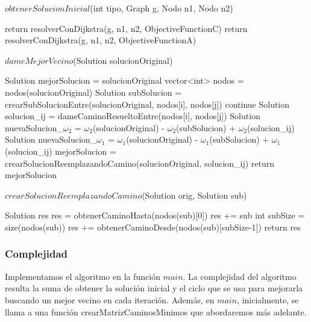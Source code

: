\begin{algorithm}[H]
\caption{$obtenerSolucionInicial$(int tipo, Graph g, Nodo n1, Nodo n2)}
\begin{algorithmic}[1]
	\State return resolverConDijkstra(g, n1, n2, ObjectiveFunctionC)
  \EndIf
  \State return resolverConDijkstra(g, n1, n2, ObjectiveFunctionA)
\end{algorithmic}
\end{algorithm}

\begin{algorithm}[H]
\caption{$dameMejorVecino$(Solution solucionOriginal)}
\begin{algorithmic}[1]	
	  \State Solution mejorSolucion = solucionOriginal
	  \State vector<int> nodos = nodos(solucionOriginal)
			\State Solution subSolucion = crearSubSolucionEntre(solucionOriginal, nodos[i], nodos[j])
				\State continue
			\EndIf
			\State Solution solucion\_ij = dameCaminoResueltoEntre(nodos[i], nodos[j])
			\State Solution nuevaSolucion\_$\omega_2$ = $\omega_2$(solucionOriginal) - $\omega_2$(subSolucion) + $\omega_2$(solucion\_ij)
			\State Solution nuevaSolucion\_$\omega_1$ = $\omega_1$(solucionOriginal) - $\omega_1$(subSolucion) + $\omega_1$(solucion\_ij)			
				\State mejorSolucion = crearSolucionReemplazandoCamino(solucionOriginal, solucion\_ij)
			\EndIf
		\EndFor
	\EndFor
	\State return mejorSolucion
\end{algorithmic}
\end{algorithm}

\begin{algorithm}[H]
\caption{$crearSolucionReemplazandoCamino$(Solution orig, Solution sub)}
\begin{algorithmic}[1]	
	 \State Solution res
	 \State res = obtenerCaminoHasta(nodos(sub)[0])
	 \State res += sub
	 \State int subSize = size(nodos(sub))
	 \State res += obtenerCaminoDesde(nodos(sub)[subSize-1])	  
	\State return res
\end{algorithmic}
\end{algorithm}

\subsubsection{Complejidad}

Implementamos el algoritmo en la función $main$. La complejidad del algoritmo resulta la suma de obtener la solución inicial y el ciclo que se usa para mejorarla buscando un mejor vecino en cada iteración. 
Además, en $main$, inicialmente, se llama a una función crearMatrizCaminosMinimos que abordaremos más adelante.

